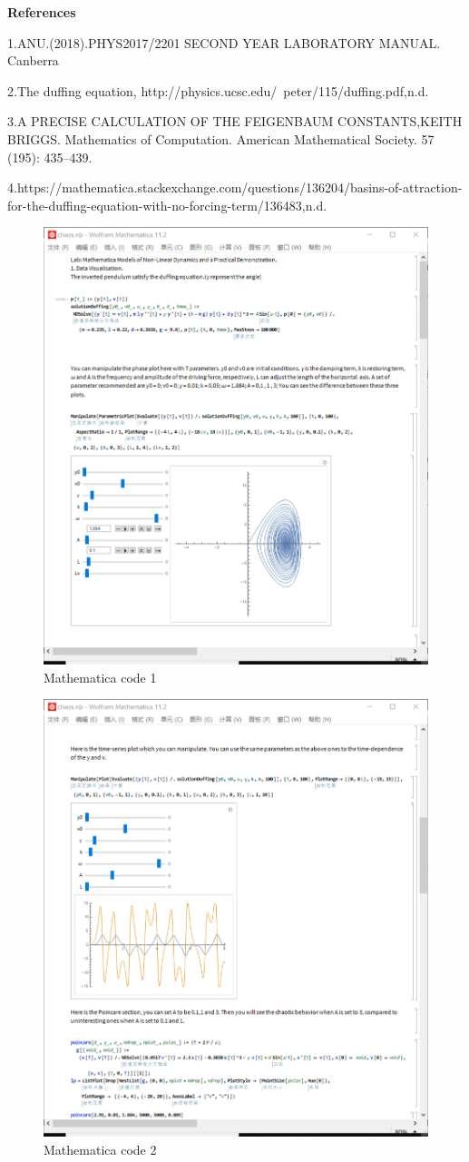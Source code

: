 \documentclass{article}
\begin{document}
\textbf{References}


1.ANU.(2018).PHYS2017/2201 SECOND YEAR LABORATORY MANUAL. Canberra

2.The duffing equation, http://physics.ucsc.edu/~peter/115/duffing.pdf,n.d.

3.A PRECISE CALCULATION OF THE FEIGENBAUM CONSTANTS,KEITH BRIGGS. Mathematics of Computation. American Mathematical Society. 57 (195): 435–439.

4.https://mathematica.stackexchange.com/questions/136204/basins-of-attraction-for-the-duffing-equation-with-no-forcing-term/136483,n.d.


\begin{figure}[h]
	\centering
	\includegraphics[width=0.6\linewidth]{plot/code1}
	\caption{Mathematica code 1}
	\label{fig:code1}
\end{figure}
\begin{figure}[h]
	\centering
	\includegraphics[width=0.6\linewidth]{plot/code2}
	\caption{Mathematica code 2}
	\label{fig:code2}
\end{figure}
\end{document}
